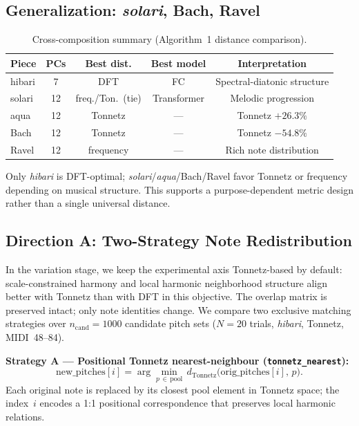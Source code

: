 \documentclass[conference,10pt,a4paper]{IEEEtran}
\begin{document}
\subsection{Generalization: \emph{solari}, Bach, Ravel}
\label{subsec:generalization}

\begin{table}[t]
\centering
\caption{Cross-composition summary (Algorithm~1 distance comparison).}
\label{tab:generalization}
\begin{tabular}{lcccc}
\toprule
Piece & PCs & Best dist. & Best model & Interpretation \\
\midrule
hibari & 7 & DFT & FC & Spectral-diatonic structure \\
solari & 12 & freq./Ton.\ (tie) & Transformer & Melodic progression \\
aqua   & 12 & Tonnetz & --- & Tonnetz $+26.3\%$ \\
Bach   & 12 & Tonnetz & --- & Tonnetz $-54.8\%$ \\
Ravel  & 12 & frequency & --- & Rich note distribution \\
\bottomrule
\end{tabular}
\end{table}

Only \emph{hibari} is DFT-optimal; \emph{solari}/\emph{aqua}/Bach/Ravel favor
Tonnetz or frequency depending on musical structure. This supports a
purpose-dependent metric design rather than a single universal distance.

\subsection{Direction A: Two-Strategy Note Redistribution}
\label{subsec:dirA}

In the variation stage, we keep the experimental axis Tonnetz-based by
default: scale-constrained harmony and local harmonic neighborhood
structure align better with Tonnetz than with DFT in this objective.
The overlap matrix is preserved intact; only note identities change.
We compare two exclusive matching strategies over $n_{\mathrm{cand}}=1000$
candidate pitch sets ($N=20$ trials, \emph{hibari}, Tonnetz, MIDI~48--84).

\textbf{Strategy A --- Positional Tonnetz nearest-neighbour
(\texttt{tonnetz\_nearest}):}
\begin{equation}
\mathrm{new\_pitches}[i]
  = \arg\min_{p\,\in\,\mathrm{pool}}\,d_{\mathrm{Tonnetz}}
    \!\bigl(\mathrm{orig\_pitches}[i],\,p\bigr).
\end{equation}
Each original note is replaced by its closest pool element in Tonnetz
space; the index~$i$ encodes a 1:1 positional correspondence that
preserves local harmonic relations.
\end{document}
